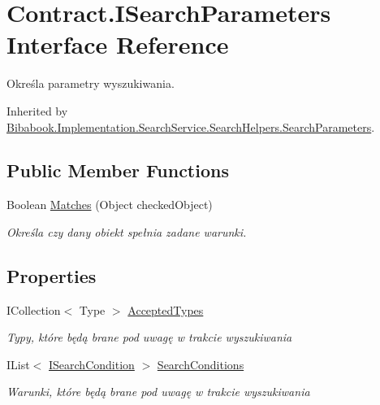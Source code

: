 \hypertarget{interface_contract_1_1_i_search_parameters}{}\section{Contract.\+I\+Search\+Parameters Interface Reference}
\label{interface_contract_1_1_i_search_parameters}


Określa parametry wyszukiwania.  




Inherited by \hyperlink{class_bibabook_1_1_implementation_1_1_search_service_1_1_search_helpers_1_1_search_parameters}{Bibabook.\+Implementation.\+Search\+Service.\+Search\+Helpers.\+Search\+Parameters}.

\subsection*{Public Member Functions}
\begin{DoxyCompactItemize}
\item 
Boolean \hyperlink{interface_contract_1_1_i_search_parameters_a03a645beba21473863d3a5b31e63521f}{Matches} (Object checked\+Object)
\begin{DoxyCompactList}\small\item\em Określa czy dany obiekt spełnia zadane warunki. \end{DoxyCompactList}\end{DoxyCompactItemize}
\subsection*{Properties}
\begin{DoxyCompactItemize}
\item 
I\+Collection$<$ Type $>$ \hyperlink{interface_contract_1_1_i_search_parameters_ab914f4680e9cfc44fec54e9e42a8e865}{Accepted\+Types}
\begin{DoxyCompactList}\small\item\em Typy, które będą brane pod uwagę w trakcie wyszukiwania \end{DoxyCompactList}\item 
I\+List$<$ \hyperlink{interface_contract_1_1_i_search_condition}{I\+Search\+Condition} $>$ \hyperlink{interface_contract_1_1_i_search_parameters_a762fa2e5b252e1c1f6bc80a3c48c46be}{Search\+Conditions}
\begin{DoxyCompactList}\small\item\em Warunki, które będą brane pod uwagę w trakcie wyszukiwania \end{DoxyCompactList}\end{DoxyCompactItemize}


